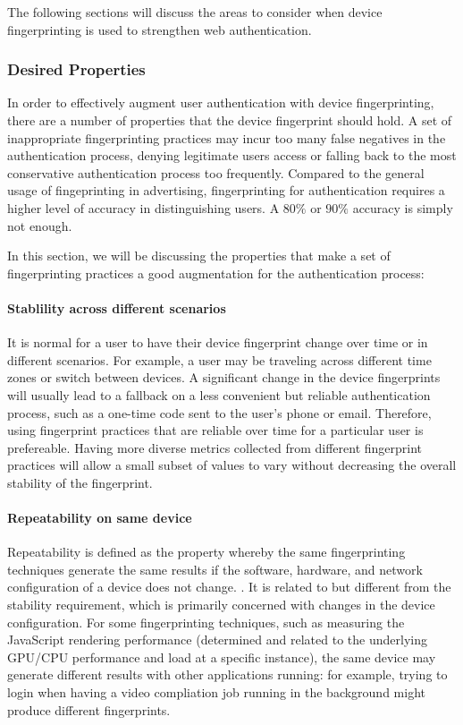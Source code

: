 \documentclass{acm_proc_article-sp}
\begin{document}
The following sections will discuss the areas to consider when device fingerprinting is used to strengthen web authentication.


\subsubsection{Desired Properties}
In order to effectively augment user authentication with device fingerprinting, there are a number of properties that the device fingerprint should hold. A set of inappropriate fingerprinting practices may incur too many false negatives in the authentication process, denying legitimate users access or falling back to the most conservative authentication process too frequently. 
Compared to the general usage of fingeprinting in advertising, fingerprinting for authentication requires a higher level of accuracy in distinguishing users. A $80\%$ or $90\%$ accuracy is simply not enough. \cite{alca:dev}

In this section, we will be discussing the properties that make a set of fingerprinting practices a good augmentation for the authentication process:

\paragraph{Stablility across different scenarios}
It is normal for a user to have their device fingerprint change over time or in different scenarios. For example,  a user may be traveling across different time zones or switch between devices. 
A significant change in the device fingerprints will usually lead to a fallback on a less convenient but reliable authentication process, such as a one-time code sent to the user's phone or email. Therefore, using fingerprint practices that are reliable over time for a particular user is prefereable. Having more diverse metrics collected from different fingerprint practices will allow a small subset of values to vary without decreasing the overall stability of the fingerprint.

\paragraph{Repeatability on same device}
Repeatability is defined as the property whereby the same fingerprinting techniques generate the same results if the software, hardware, and network configuration of a device does not change. \cite{alca:dev}. It is related to but different from the stability requirement, which is primarily concerned  with changes in the device configuration.
For some  fingerprinting techniques, such as measuring the JavaScript rendering performance (determined and related to the underlying GPU/CPU performance and load at a specific instance), the same device may generate different results with other applications running: for example, trying to login when having a video compliation job running in the background might produce different fingerprints.
\end{document}
